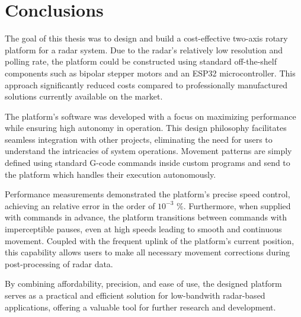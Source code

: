 \chapter*{Conclusions}

The goal of this thesis was to design and build a cost-effective two-axis rotary platform for a radar system.
Due to the radar's relatively low resolution and polling rate, the platform could be constructed using standard off-the-shelf components such as bipolar stepper motors and an ESP32 microcontroller.
This approach significantly reduced costs compared to professionally manufactured solutions currently available on the market.

The platform's software was developed with a focus on maximizing performance while ensuring high autonomy in operation.
This design philosophy facilitates seamless integration with other projects, eliminating the need for users to understand the intricacies of system operations.
Movement patterns are simply defined using standard G-code commands inside custom programs and send to the platform which handles their execution autonomously.

Performance measurements demonstrated the platform’s precise speed control, achieving an relative error in the order of $10^{-3}$ \%.
Furthermore, when supplied with commands in advance, the platform transitions between commands with imperceptible pauses, even at high speeds leading to smooth and continuous movement.
Coupled with the frequent uplink of the platform's current position, this capability allows users to make all necessary movement corrections during post-processing of radar data.

By combining affordability, precision, and ease of use, the designed platform serves as a practical and efficient solution for low-bandwith radar-based applications, offering a valuable tool for further research and development.
